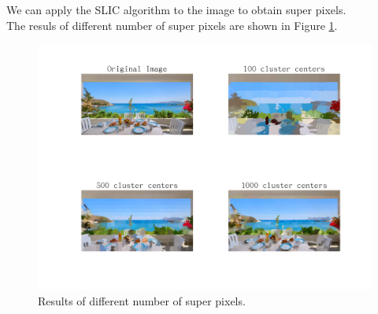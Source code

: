 We can apply the SLIC algorithm to the image to obtain super pixels.\\
The resuls of different number of super pixels are shown in Figure \ref{fig:p3}.\\

\begin{figure}[htbp]
    \centering
	\includegraphics[width=\textwidth]{../images/p3/p3.png}
    \caption{Results of different number of super pixels.}
    \label{fig:p3}
\end{figure}